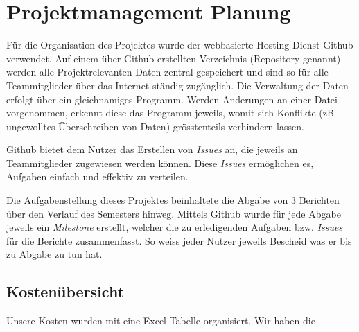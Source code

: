 \section{Projektmanagement Planung}
Für die Organisation des Projektes wurde der webbasierte Hosting-Dienst Github verwendet. Auf einem über Github erstellten Verzeichnis (Repository genannt) werden alle Projektrelevanten Daten zentral gespeichert und sind so für alle Teammitglieder über das Internet ständig zugänglich. Die Verwaltung der Daten erfolgt über ein gleichnamiges Programm. Werden Änderungen an einer Datei vorgenommen, erkennt diese das Programm jeweils, womit sich Konflikte (zB ungewolltes Überschreiben von Daten) grösstenteils verhindern lassen.

Github bietet dem Nutzer das Erstellen von \emph{Issues} an, die jeweils an Teammitglieder zugewiesen werden können. Diese \emph{Issues} ermöglichen es, Aufgaben einfach und effektiv zu verteilen.

Die Aufgabenstellung dieses Projektes beinhaltete die Abgabe von 3 Berichten über den Verlauf des Semesters hinweg. Mittels Github wurde für jede Abgabe jeweils ein \emph{Milestone} erstellt, welcher die zu erledigenden Aufgaben bzw. \emph{Issues} für die Berichte zusammenfasst. So weiss jeder Nutzer jeweils Bescheid was er bis zu Abgabe zu tun hat.
\subsection{Kostenübersicht}
Unsere Kosten wurden mit eine Excel Tabelle organisiert. Wir haben die






